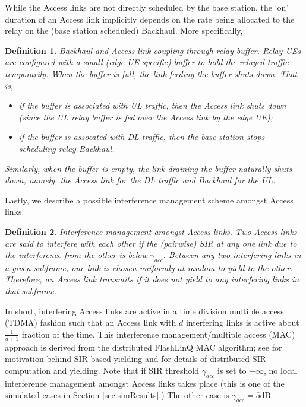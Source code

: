 \documentclass[journal]{IEEEtran}
\newtheorem{definit}{Definition}
\begin{document}
While the Access links are not directly scheduled by the base station, the `on' duration of an Access link implicitly depends on the rate being allocated to the relay on the (base station scheduled) Backhaul. More specifically,
\begin{definit}
    {\em Backhaul and Access link coupling through relay buffer.} Relay UEs are configured with a small (edge UE specific) buffer to hold the relayed traffic temporarily.  When the buffer is full, the link feeding the buffer shuts down.  That is,
    \begin{itemize}
        \item if the buffer is associated with UL traffic, then the Access link shuts down (since the UL relay buffer is fed over the Access link by the edge UE);
        \item if the buffer is assocated with DL traffic, then the base station stops scheduling relay Backhaul.
    \end{itemize}
    Similarly, when the buffer is empty, the link draining the buffer naturally shuts down, namely, the Access link for the DL traffic and Backhaul for the UL.
\end{definit}

Lastly, we describe a possible interference management scheme amongst Access links.
\begin{definit}
	{\em Interference management amongst Access links.}  Two Access links are said to interfere with each other if the (pairwise) SIR at any one link due to the interference from the other is below $\gamma_{acc}$.  Between any two interfering links in a given subframe, one link is chosen uniformly at random to yield to the other.  Therefore, an Access link transmits if it does not yield to any interfering links in that subframe.
\end{definit}

In short, interfering Access links are active in a time division multiple access (TDMA) fashion such that an Access link with $d$ interfering links is active about $\frac{1}{d+1}$ fraction of the time. This interference management/multiple access (MAC) approach is derived from the distributed FlashLinQ MAC algorithm; see \cite[Sec.~I-A]{WuTavildarShakkottai10} for motivation behind SIR-based yielding and \cite[Sec.~III]{WuTavildarShakkottai10} for details of distributed SIR computation and yielding.
Note that if SIR threshold $\gamma_{acc}$ is set to $-\infty$, no local interference management amongst Access links takes place (this is one of the simulated cases in Section \ref{sec:simResults}.)  The other case is $\gamma_{acc}=5$dB.
\end{document}
